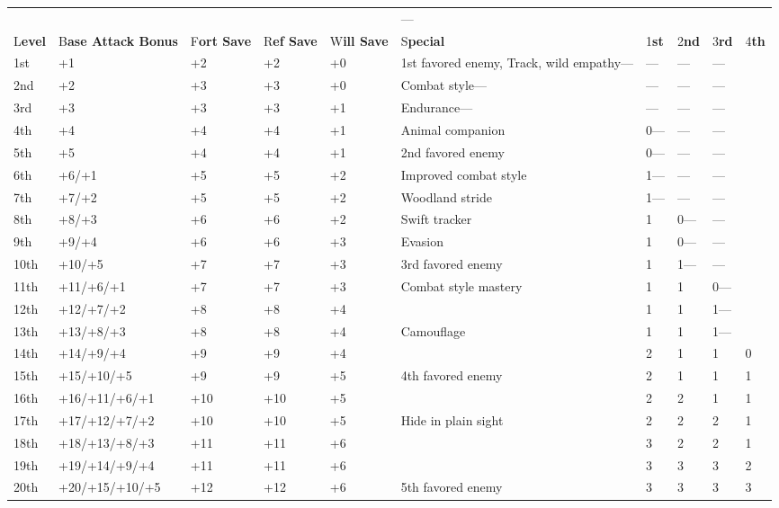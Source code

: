 \documentclass{article}
\begin{document}
\vspace{12pt}
\begin{tabular}{|>{\raggedright}p{19pt}|>{\raggedright}p{48pt}|>{\raggedright}p{14pt}|>{\raggedright}p{15pt}|>{\raggedright}p{13pt}|>{\raggedright}p{67pt}|>{\raggedright}p{10pt}|>{\raggedright}p{14pt}|>{\raggedright}p{13pt}|>{\raggedright}p{12pt}|}
\hline
\multicolumn{10}{|p{230pt}|}{T\textbf{able: The Ranger}}\tabularnewline
\hline
 &  &  &  &  & --- & \multicolumn{4}{p{50pt}|}{S\textbf{pells per Day---}}\tabularnewline
\hline
L\textbf{evel} & B\textbf{ase Attack Bonus} & F\textbf{ort Save} & R\textbf{ef 
Save} & W\textbf{ill Save} & S\textbf{pecial} & 1\textbf{st} & 2\textbf{nd} & 3\textbf{rd} & 4\textbf{th}\tabularnewline
\hline
1st & +1 & +2 & +2 & +0 & 1st favored enemy, Track, wild empathy--- & --- & --- & --- & \tabularnewline
\hline
2nd & +2 & +3 & +3 & +0 & Combat style--- & --- & --- & --- & \tabularnewline
\hline
3rd & +3 & +3 & +3 & +1 & Endurance--- & --- & --- & --- & \tabularnewline
\hline
4th & +4 & +4 & +4 & +1 & Animal companion & 0--- & --- & --- & \tabularnewline
\hline
5th & +5 & +4 & +4 & +1 & 2nd favored enemy & 0--- & --- & --- & \tabularnewline
\hline
6th & +6/+1 & +5 & +5 & +2 & Improved combat style & 1--- & --- & --- & \tabularnewline
\hline
7th & +7/+2 & +5 & +5 & +2 & Woodland stride & 1--- & --- & --- & \tabularnewline
\hline
8th & +8/+3 & +6 & +6 & +2 & Swift tracker & 1 & 0--- & --- & \tabularnewline
\hline
9th & +9/+4 & +6 & +6 & +3 & Evasion & 1 & 0--- & --- & \tabularnewline
\hline
10th & +10/+5 & +7 & +7 & +3 & 3rd favored enemy & 1 & 1--- & --- & \tabularnewline
\hline
11th & +11/+6/+1 & +7 & +7 & +3 & Combat style mastery & 1 & 1 & 0--- & \tabularnewline
\hline
12th & +12/+7/+2 & +8 & +8 & +4 &  & 1 & 1 & 1--- & \tabularnewline
\hline
13th & +13/+8/+3 & +8 & +8 & +4 & Camouflage & 1 & 1 & 1--- & \tabularnewline
\hline
14th & +14/+9/+4 & +9 & +9 & +4 &  & 2 & 1 & 1 & 0\tabularnewline
\hline
15th & +15/+10/+5 & +9 & +9 & +5 & 4th favored enemy & 2 & 1 & 1 & 1\tabularnewline
\hline
16th & +16/+11/+6/+1 & +10 & +10 & +5 &  & 2 & 2 & 1 & 1\tabularnewline
\hline
17th & +17/+12/+7/+2 & +10 & +10 & +5 & Hide in plain sight & 2 & 2 & 2 & 1\tabularnewline
\hline
18th & +18/+13/+8/+3 & +11 & +11 & +6 &  & 3 & 2 & 2 & 1\tabularnewline
\hline
19th & +19/+14/+9/+4 & +11 & +11 & +6 &  & 3 & 3 & 3 & 2\tabularnewline
\hline
20th & +20/+15/+10/+5 & +12 & +12 & +6 & 5th favored enemy & 3 & 3 & 3 & 3\tabularnewline
\hline
\end{tabular}

\vspace{12pt}
\end{document}
